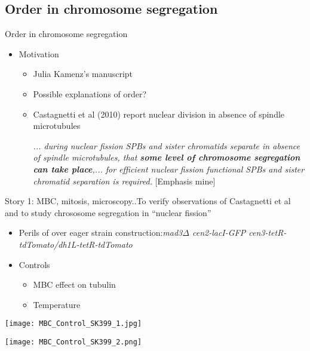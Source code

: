 \subsection{Order in chromosome segregation}
\begin{frame}[allowframebreaks]{Order in chromosome segregation}
\begin{itemize}
	\item Motivation 
		\begin{itemize}
			\item Julia Kamenz's manuscript \cite{JulKam2015}
			\item Possible explanations of order?
			\item Castagnetti et al (2010) report nuclear division in absence of spindle microtubules \cite{Casta2010}

\emph{... during nuclear fission SPBs and sister chromatids separate in absence of spindle microtubules, that {\bf some level of chromosome segregation can take place},... for efficient nuclear fission functional SPBs and sister chromatid separation is required.} [Emphasis mine]
		\end{itemize}
\end{itemize}
\end{frame}
\begin{frame}[allowframebreaks]{Story 1: MBC, mitosis, microscopy..}{To verify observations of Castagnetti et al and to study chrososome segregation in ``nuclear fission''}

\begin{itemize}
\item Perils of over eager strain construction:{\it mad3$\Delta$ cen2-lacI-GFP cen3-tetR-tdTomato/dh1L-tetR-tdTomato}
\item Controls
	\begin{itemize}
	\item MBC effect on tubulin
	\item Temperature
	\end{itemize}
\end{itemize}
\framebreak
\begin{center}
\texttt{[image: MBC\_Control\_SK399\_1.jpg]}
\end{center}
\framebreak

\begin{center}
\texttt{[image: MBC\_Control\_SK399\_2.png]}
\end{center}
\end{frame}

